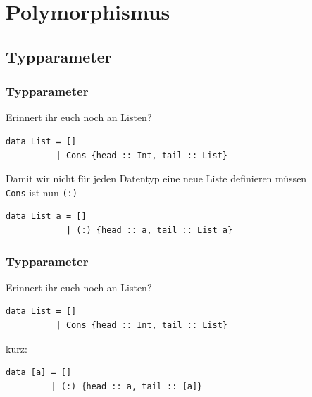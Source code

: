 \documentclass[fleqn,11pt,aspectratio=43]{beamer}
\begin{document}
\section{Polymorphismus}
\subsection{Typparameter}

\begin{frame}[fragile]
\frametitle{Typparameter}
\begin{block}{Erinnert ihr euch noch an Listen?}
\begin{lstlisting}
data List = []
          | Cons {head :: Int, tail :: List}
\end{lstlisting}
\end{block}
\pause[1]
\begin{block}{Damit wir nicht für jeden Datentyp eine neue Liste definieren müssen\\
\lstinline|Cons| ist nun \lstinline|(:)|}
\begin{lstlisting}
data List a = []
            | (:) {head :: a, tail :: List a}
\end{lstlisting}
\end{block}
\end{frame}

\begin{frame}[fragile]
\frametitle{Typparameter}
\begin{block}{Erinnert ihr euch noch an Listen?}
\begin{lstlisting}
data List = []
          | Cons {head :: Int, tail :: List}
\end{lstlisting}
\end{block}
\begin{block}{kurz:}
\begin{lstlisting}
data [a] = []
         | (:) {head :: a, tail :: [a]}
\end{lstlisting}
\end{block}
\end{frame}
\end{document}

